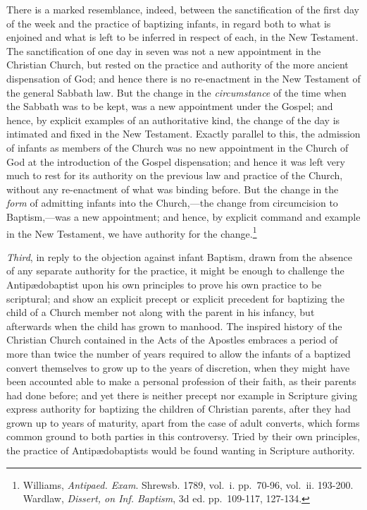 \documentclass[english,]{book}
\begin{document}
There is a marked resemblance, indeed, between the sanctification of the first day of the week and the practice of baptizing infants, in regard both to what is enjoined and what is left to be inferred in respect of each, in the New Testament. The sanctification of one day in seven was not a new appointment in the Christian Church, but rested on the practice and authority of the more ancient dispensation of God; and hence there is no re-enactment in the New Testament of the general Sabbath law. But the change in the \emph{circumstance} of the time when the Sabbath was to be kept, was a new appointment under the Gospel; and hence, by explicit examples of an authoritative kind, the change of the day is intimated and fixed in the New Testament. Exactly parallel to this, the admission of infants as members of the Church was no new appointment in the Church of God at the introduction of the Gospel dispensation; and hence it was left very much to rest for its authority on the previous law and practice of the Church, without any re-enactment of what was binding before. But the change in the \emph{form} of admitting infants into the Church,---the change from circumcision to Baptism,---was a new appointment; and hence, by explicit command and example in the New Testament, we have authority for the change.\footnote{Williams, \emph{Antipaed. Exam}. Shrewsb. 1789, vol.~i. pp.~70-96, vol.~ii. 193-200. Wardlaw, \emph{Dissert, on Inf. Baptism}, 3d ed. pp.~109-117, 127-134.}

\emph{Third}, in reply to the objection against infant Baptism, drawn from the absence of any separate authority for the practice, it might be enough to challenge the Antipædobaptist upon his own principles to prove his own practice to be scriptural; and show an explicit precept or explicit precedent for baptizing the child of a Church member not along with the parent in his infancy, but afterwards when the child has grown to manhood. The inspired history of the Christian Church contained in the Acts of the Apostles embraces a period of more than twice the number of years required to allow the infants of a baptized convert themselves to grow up to the years of discretion, when they might have been accounted able to make a personal profession of their faith, as their parents had done before; and yet there is neither precept nor example in Scripture giving express authority for baptizing the children of Christian parents, after they had grown up to years of maturity, apart from the case of adult converts, which forms common ground to both parties in this controversy. Tried by their own principles, the practice of Antipædobaptists would be found wanting in Scripture authority.
\end{document}
